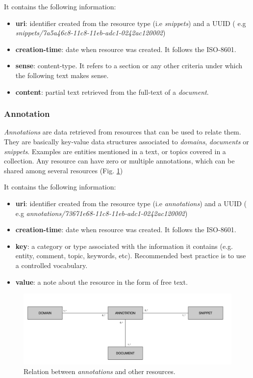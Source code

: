 It contains the following information:
\begin{itemize}
\item \textbf{uri}: identifier created from the resource type (i.e \textit{snippets}) and a UUID ( e.g \textit{snippets/7a5a46c8-11c8-11eb-adc1-0242ac120002})
\item \textbf{creation-time}: date when resource was created. It follows the ISO-8601.
\item \textbf{sense}: content-type. It refers to a section or any other criteria under which the following text makes sense.
\item \textbf{content}: partial text retrieved from the full-text of a \textit{document}.
\end{itemize}

\subsubsection{Annotation}

\textit{Annotations} are data retrieved from resources that can be used to relate them. They are basically key-value data structures associated to \textit{domains}, \textit{documents} or \textit{snippets}. Examples are entities mentioned in a text, or topics covered in a collection. Any resource can have zero or multiple annotations, which can be shared among several resources (Fig. \ref{fig:librairy-model-annotation})

It contains the following information:
\begin{itemize}
\item \textbf{uri}: identifier created from the resource type (i.e \textit{annotations}) and a UUID ( e.g \textit{annotations/73671e68-11c8-11eb-adc1-0242ac120002})
\item \textbf{creation-time}: date when resource was created. It follows the ISO-8601.
\item \textbf{key}: a category or type associated with the information it contains (e.g. entity, comment, topic, keywords, etc). Recommended best practice is to use a controlled vocabulary.
\item \textbf{value}: a note about the resource in the form of free text.
\end{itemize}

\begin{figure}
  \center
  \includegraphics[scale=0.4]{model-annotation.png}
  \caption{Relation between \textit{annotations} and other resources.}
  \label{fig:librairy-model-annotation}
\end{figure}

